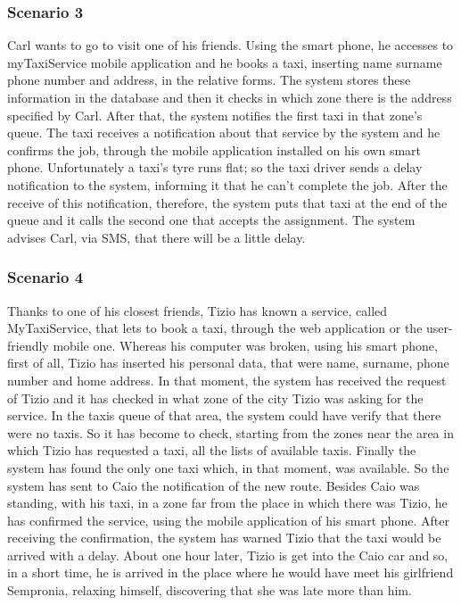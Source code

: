 		\subsubsection{Scenario 3}
		Carl wants to go to visit one of his friends. Using the smart phone, he accesses to myTaxiService mobile application and he books a taxi, inserting name surname phone number and address, in the relative forms. The system stores these information in the database and then it checks in which zone there is the address specified by Carl. After that, the system notifies the first taxi in that zone's queue. The taxi receives a notification about that service by the system and he confirms the job, through the mobile application installed on his own smart phone. 
		Unfortunately a taxi's tyre runs flat; so the taxi driver sends a delay notification to the system, informing it that he can't complete the job. After the receive of this notification, therefore, the system puts that taxi at the end of the queue and it calls the second one that accepts the assignment. The system advises Carl, via SMS, that there will be a little delay.
		
		\subsubsection{Scenario 4}
		Thanks to one of his closest friends, Tizio has known a service, called MyTaxiService, that lets to book a taxi, through the web application or the user-friendly mobile one.
		Whereas his computer was broken, using his smart phone, first of all, Tizio has inserted his personal data, that were name, surname, phone number and home address. In that moment, the system has received the request of Tizio and it has checked in what zone of the city Tizio was asking for the service. In the taxis queue of that area, the system could have verify that there were no taxis. So it has become to check, starting from the zones near the area in which Tizio has requested a taxi, all the lists of available taxis. 
		Finally the system has found the only one taxi which, in that moment, was available. So the system has sent to Caio the notification of the new route. Besides Caio was standing, with his taxi, in a zone far from the place in which there was Tizio, he has confirmed the service, using the mobile application of his smart phone. After receiving the confirmation, the system has warned Tizio that the taxi would be arrived with a delay.
		About one hour later, Tizio is get into the Caio car and so, in a short time, he is arrived in the place where he would have meet his girlfriend Sempronia, relaxing himself, discovering that she was late more than him.
		
